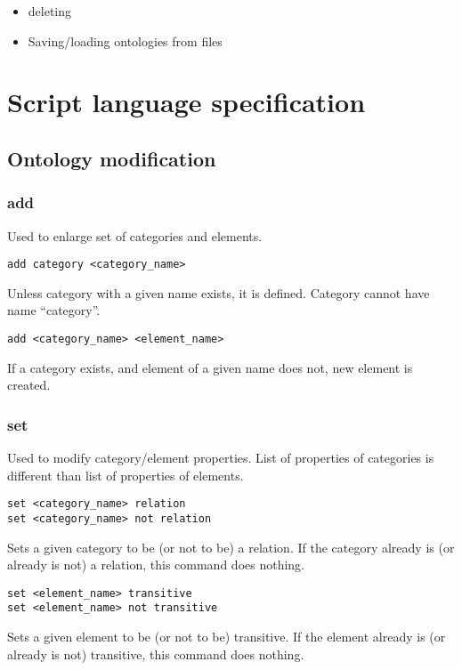\documentclass{article}
\begin{document}
\begin{itemize}

  \item deleting

  \item Saving/loading ontologies from files

\end{itemize}

\section{Script language specification}

\subsection{Ontology modification}

\subsubsection{add}
Used to enlarge set of categories and elements.

\begin{verbatim}
add category <category_name>
\end{verbatim}
Unless category with a given name exists, it is defined. Category cannot 
have name ``category''.

\begin{verbatim}
add <category_name> <element_name>
\end{verbatim}
If a category exists, and element of a given name does not, new element is created.

\subsubsection{set}
Used to modify category/element properties. List of properties of categories 
is different than list of properties of elements. 

\begin{verbatim}
set <category_name> relation
set <category_name> not relation
\end{verbatim}
Sets a given category to be (or not to be) a relation. If the category already is 
(or already is not) a relation, this command does nothing.

\begin{verbatim}
set <element_name> transitive
set <element_name> not transitive
\end{verbatim}
Sets a given element to be (or not to be) transitive. If the element already is 
(or already is not) transitive, this command does nothing.
\end{document}
